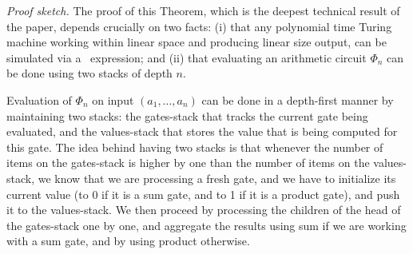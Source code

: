 %
%

\textit{Proof sketch.} The proof of this Theorem, which is the deepest technical result of the paper, depends crucially on two facts: (i) that any polynomial time Turing machine working within linear space and producing linear size output, can be simulated via a \langfor\ expression; and (ii) that evaluating an arithmetic circuit $\Phi_n$ can be done using two stacks of  depth $n$.

Evaluation of $\Phi_n$ on input $(a_1,\ldots ,a_n)$ can be done in a depth-first manner by maintaining  two stacks: the gates-stack that tracks the current gate being evaluated, and the values-stack that stores the value that is being computed for this gate. The idea behind having two stacks is that whenever the number of items on the gates-stack is higher by one than the number of items on the values-stack, we know that we are processing a fresh gate, and we have to initialize its current value (to 0 if it is a sum gate, and to 1 if it is a product gate), and push it to the values-stack. We then proceed by processing the children of the head of the gates-stack one by one, and aggregate the results using sum if we are working with a sum gate, and by using product otherwise. 

